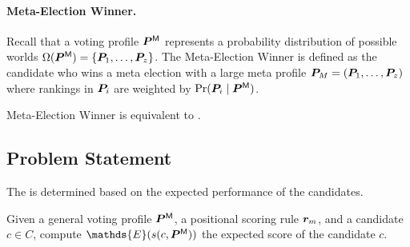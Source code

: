 \begin{theorem}
  \label{theorem:least_expected_regret_winner}
  \theoremLeastExpectedRegretWinner
\end{theorem}


\paragraph{Meta-Election Winner.}
Recall that a voting profile $\bm{P}^{\mathsf{M}}$ represents a probability distribution of possible worlds $\Omega(\bm{P}^{\mathsf{M}}) = \{ \bm{P}_1, \ldots, \bm{P}_z \}$.
The Meta-Election Winner is defined as the candidate who wins a meta election with a large meta profile $\bm{P}_M = (\bm{P}_1, \ldots, \bm{P}_z)$ where rankings in $\bm{P}_i$ are weighted by $\Pr(\bm{P}_i \mid \bm{P}^{\mathsf{M}})$.

\def\theoremGiganticElectionWinner{
  Meta-Election Winner is equivalent to \mew.
}

\begin{theorem}
  \label{theorem:gigantic_election_winner}
  \theoremGiganticElectionWinner
\end{theorem}

\subsection{Problem Statement}
\label{sec:problem}

The \mew is determined based on the expected performance of the candidates. 

\begin{definition} [\esc] \label{def:esc}
  Given a general voting profile $\bm{P}^{\mathsf{M}}$, a positional scoring rule $\bm{r}_m$, and a candidate $c \in C$, compute $\mathds{E}(\score(c, \probaVP))$ the expected score of the candidate $c$.
\end{definition}
